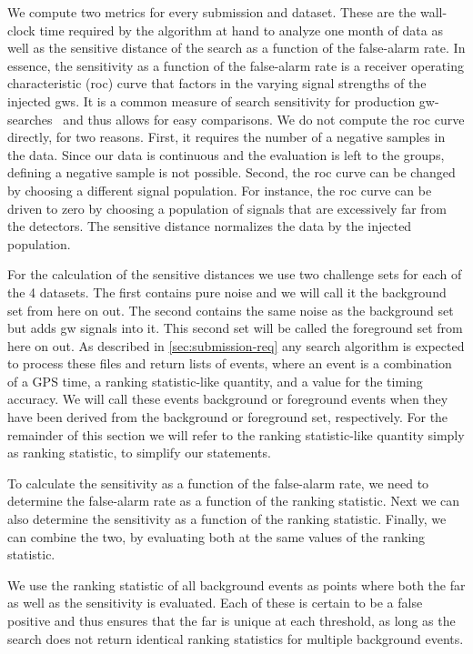 We compute two metrics for every submission and dataset. These are the wall-clock time required by the algorithm at hand to analyze one month of data as well as the sensitive distance of the search as a function of the false-alarm rate. In essence, the sensitivity as a function of the false-alarm rate is a receiver operating characteristic (\acrshort{roc}) curve that factors in the varying signal strengths of the injected \acrshort{gw}s. It is a common measure of search sensitivity for production \acrshort{gw}-searches~\cite{Usman:2015kfa} and thus allows for easy comparisons. We do not compute the \acrshort{roc} curve directly, for two reasons. First, it requires the number of a negative samples in the data. Since our data is continuous and the evaluation is left to the groups, defining a negative sample is not possible. Second, the \acrshort{roc} curve can be changed by choosing a different signal population. For instance, the \acrshort{roc} curve can be driven to zero by choosing a population of signals that are excessively far from the detectors. The sensitive distance normalizes the data by the injected population.

For the calculation of the sensitive distances we use two challenge sets for each of the 4 datasets. The first contains pure noise and we will call it the background set from here on out. The second contains the same noise as the background set but adds \acrshort{gw} signals into it. This second set will be called the foreground set from here on out. As described in \autoref{sec:submission-req} any search algorithm is expected to process these files and return lists of events, where an event is a combination of a GPS time, a ranking statistic-like quantity, and a value for the timing accuracy. We will call these events background or foreground events when they have been derived from the background or foreground set, respectively. For the remainder of this section we will refer to the ranking statistic-like quantity simply as ranking statistic, to simplify our statements.

To calculate the sensitivity as a function of the false-alarm rate, we need to determine the false-alarm rate as a function of the ranking statistic. Next we can also determine the sensitivity as a function of the ranking statistic. Finally, we can combine the two, by evaluating both at the same values of the ranking statistic.

We use the ranking statistic of all background events as points where both the \acrshort{far} as well as the sensitivity is evaluated. Each of these is certain to be a false positive and thus ensures that the \acrshort{far} is unique at each threshold, as long as the search does not return identical ranking statistics for multiple background events.

